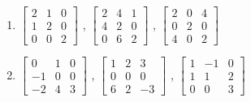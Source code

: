 \begin{enumerate}
\begin{enumerate}
\item 
	$\begin{bmatrix}
	2 &1 &0\\
	1 &2 &0\\
	0 &0 &2
	\end{bmatrix}$
,	$\begin{bmatrix}
	2 &4 &1\\
	4 &2 &0\\
	0 &6 &2
	\end{bmatrix}$
,	$\begin{bmatrix}
	2 &0 &4\\
	0 &2 &0\\
	4 &0 &2
	\end{bmatrix}$

\item 
	$\begin{bmatrix}
	0 &1 &0\\
	-1 &0 &0\\
	-2 &4 &3
	\end{bmatrix}$
,	$\begin{bmatrix}
	1 &2 &3\\
	0 &0 &0\\
	6 &2 &-3
	\end{bmatrix}$
,	$\begin{bmatrix}
	1 &-1 &0\\
	1 &1 &2\\
	0 &0 &3
	\end{bmatrix}$
\end{enumerate}






\end{enumerate}
